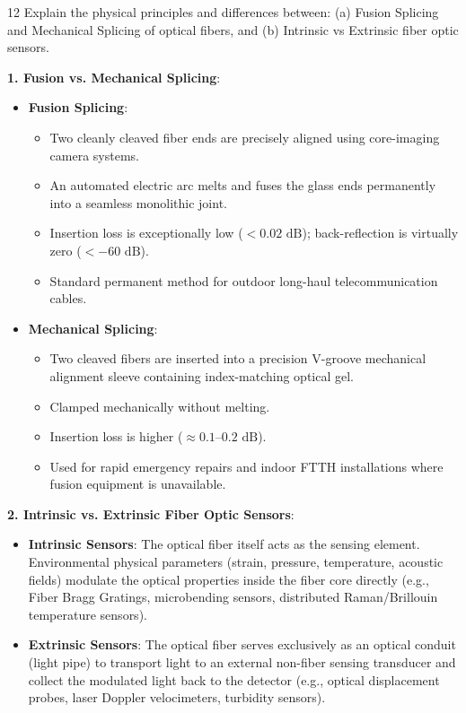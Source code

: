 \begin{theoryq}{12}
Explain the physical principles and differences between: (a) Fusion Splicing and Mechanical Splicing of optical fibers, and (b) Intrinsic vs Extrinsic fiber optic sensors.
\end{theoryq}
\begin{theorysol}
\textbf{1. Fusion vs. Mechanical Splicing}:
\begin{itemize}
    \item \textbf{Fusion Splicing}:
    \begin{itemize}
        \item Two cleanly cleaved fiber ends are precisely aligned using core-imaging camera systems.
        \item An automated electric arc melts and fuses the glass ends permanently into a seamless monolithic joint.
        \item Insertion loss is exceptionally low ($< 0.02\text{ dB}$); back-reflection is virtually zero ($< -60\text{ dB}$).
        \item Standard permanent method for outdoor long-haul telecommunication cables.
    \end{itemize}
    \item \textbf{Mechanical Splicing}:
    \begin{itemize}
        \item Two cleaved fibers are inserted into a precision V-groove mechanical alignment sleeve containing index-matching optical gel.
        \item Clamped mechanically without melting.
        \item Insertion loss is higher ($\approx 0.1\text{--}0.2\text{ dB}$).
        \item Used for rapid emergency repairs and indoor FTTH installations where fusion equipment is unavailable.
    \end{itemize}
\end{itemize}

\textbf{2. Intrinsic vs. Extrinsic Fiber Optic Sensors}:
\begin{itemize}
    \item \textbf{Intrinsic Sensors}:
    The optical fiber itself acts as the sensing element. Environmental physical parameters (strain, pressure, temperature, acoustic fields) modulate the optical properties inside the fiber core directly (e.g., Fiber Bragg Gratings, microbending sensors, distributed Raman/Brillouin temperature sensors).
    \item \textbf{Extrinsic Sensors}:
    The optical fiber serves exclusively as an optical conduit (light pipe) to transport light to an external non-fiber sensing transducer and collect the modulated light back to the detector (e.g., optical displacement probes, laser Doppler velocimeters, turbidity sensors).
\end{itemize}
\end{theorysol}
\vspace{4mm}

